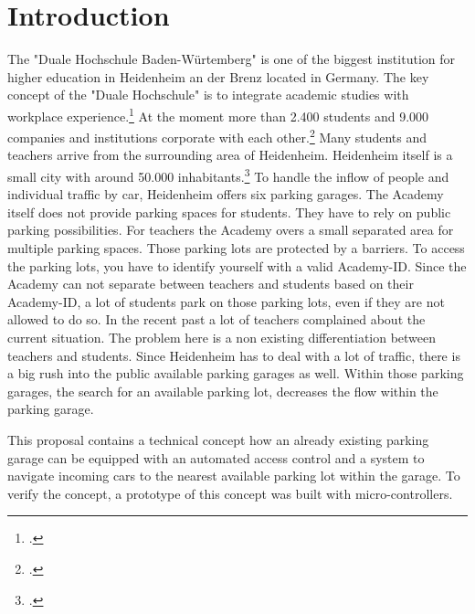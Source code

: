 \chapter{Introduction}
\par
The "Duale Hochschule Baden-Würtemberg" is one of the biggest institution for higher education in Heidenheim an der Brenz located in Germany. The key concept of the "Duale Hochschule" is to integrate academic studies with workplace experience.\footcite[][]{dhbwCooperativeState} 
At the moment more than 2.400 students and 9.000 companies and institutions corporate with each other.\footcite[][]{dhbwCooperativeState} 
Many students and teachers arrive from the surrounding area of Heidenheim. Heidenheim itself is a small city with around 50.000 inhabitants.\footcite[][]{heidenheimZahlenDaten}
To handle the inflow of people and individual traffic by car, Heidenheim offers six parking garages. The Academy itself does not provide parking spaces for students. They have to rely on public parking possibilities.
For teachers the Academy overs a small separated area for multiple parking spaces. Those parking lots are protected by a barriers. To access the parking lots, you have to identify yourself with a valid Academy-ID. Since the Academy can not separate between teachers and students based on their Academy-ID, a lot of students park on those parking lots, even if they are not allowed to do so. In the recent past a lot of teachers complained about the current situation. The problem here is a non existing differentiation between teachers and students.
Since Heidenheim has to deal with a lot of traffic, there is a big rush into the public available parking garages as well. Within those parking garages, the search for an available parking lot, decreases the flow within the parking garage. 
\par
This proposal contains a technical concept how an already existing parking garage can be equipped with an automated access control and a system to navigate incoming cars to the nearest available parking lot within the garage. 
To verify the concept, a prototype of this concept was built with micro-controllers.
